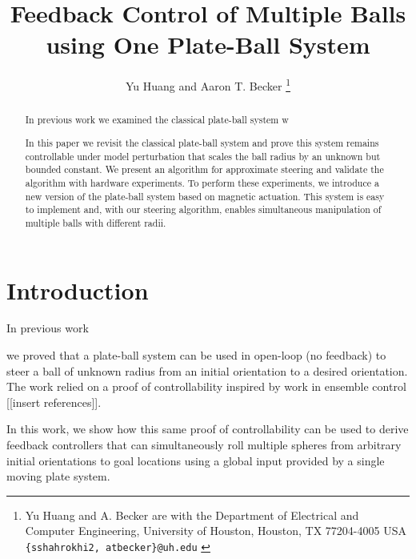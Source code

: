 \documentclass[letter paper, 10pt, conference]{ieeeconf}
\newcommand{\todo}[1]{\vspace{5 mm}\par \noindent \framebox{\begin{minipage}[c]{0.98 \columnwidth} \ttfamily\flushleft \textcolor{red}{#1}\end{minipage}}\vspace{5 mm}\par}
\begin{document}
\title{\LARGE \bf 
Feedback Control of Multiple Balls using One Plate-Ball System
}
\author{Yu Huang and  Aaron T. Becker%
\thanks{{Yu Huang and A. Becker are with the Department of Electrical and Computer Engineering,  University of Houston, Houston, TX 77204-4005 USA {\tt\small  \{sshahrokhi2, atbecker\}@uh.edu}
}
} %
} %
\maketitle




\begin{abstract}
In previous work we examined  the classical plate-ball system w

In this paper we revisit the classical plate-ball system and prove this system remains controllable under model perturbation that scales the ball radius by an unknown but bounded constant. 
We present an algorithm for approximate steering and validate the algorithm with hardware experiments. To perform these experiments, we introduce a new version of the plate-ball system based on magnetic actuation.  This system is easy to implement and, with our steering algorithm, enables simultaneous manipulation of multiple balls with different radii. 
\end {abstract}



	   

\section{Introduction}\label{sec:Intro}%



In previous work \todo{ [[insert references]] }we proved that a plate-ball system can be used in open-loop (no feedback) to steer a ball of unknown radius from an initial orientation to a desired orientation.  The work relied on a proof of controllability inspired by work in ensemble control [[insert references]].

In this work, we show how this same proof of controllability can be used to derive feedback controllers that can simultaneously roll multiple spheres from arbitrary initial orientations to goal locations using a global input provided by a single moving plate system.


\end{document}
